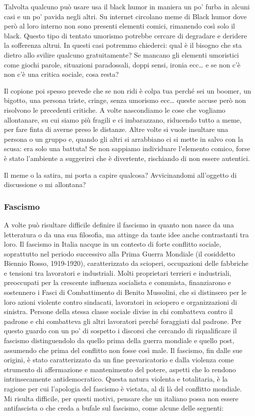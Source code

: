 \documentclass[12pt]{book} %
\begin{document}
Talvolta qualcuno può usare usa il black humor in maniera un po' furba in alcuni casi e un po' pavida negli altri. Su internet circolano meme di Black humor dove però al loro interno non sono presenti elementi comici, rimanendo così solo il black. Questo tipo di tentato umorismo potrebbe cercare di degradare e deridere la sofferenza altrui. In questi casi potremmo chiederci: qual è il bisogno che sta dietro allo svilire qualcuno gratuitamente? Se mancano gli elementi umoristici come giochi parole, situazioni paradossali, doppi sensi, ironia ecc… e se non c'è non c'è una critica sociale, cosa resta? 

Il copione poi spesso prevede che se non ridi è colpa tua perché sei un boomer, un bigotto, una persona triste, cringe, senza umorismo ecc… queste accuse però non risolvono le precedenti critiche. A volte nascondiamo le cose che vogliamo allontanare, su cui siamo più fragili e ci imbarazzano, riducendo tutto a meme, per fare finta di averne preso le distanze. Altre volte si vuole insultare una persona o un gruppo e, quando gli altri si arrabbiano ci si mette in salvo con la scusa: era solo una battuta! Se non sappiamo individuare l'elemento comico, forse è stato l'ambiente a suggerirci che è divertente, rischiando di non essere autentici.

Il meme o la satira, mi porta a capire qualcosa? Avvicinandomi all'oggetto di discussione o mi allontana?

\subsubsection{Fascismo}

A volte può risultare difficile definire il fascismo in quanto non nasce da una letteratura o da una sua filosofia, ma attinge da tante idee anche contrastanti tra loro. 
Il fascismo in Italia nacque in un contesto di forte conflitto sociale, soprattutto nel periodo successivo alla Prima Guerra Mondiale (il cosiddetto Biennio Rosso, 1919-1920), caratterizzato da scioperi, occupazioni delle fabbriche e tensioni tra lavoratori e industriali.
Molti proprietari terrieri e industriali, preoccupati per la crescente influenza socialista e comunista, finanziarono e sostennero i Fasci di Combattimento di Benito Mussolini, che si distinsero per le loro azioni violente contro sindacati, lavoratori in sciopero e organizzazioni di sinistra. Persone della stessa classe sociale divise in chi combatteva contro il padrone e chi combatteva gli altri lavoratori perché foraggiati dal padrone.
Per questo guardo con un po' di sospetto i discorsi che cercando di riqualificare il fascismo distinguendolo da quello prima della guerra mondiale e quello post, assumendo che prima del conflitto non fosse così male. Il fascismo, fin dalle sue origini, è stato caratterizzato da un fine prevaricatorio e dalla violenza come strumento di affermazione e mantenimento del potere, aspetti che lo rendono intrinsecamente antidemocratico. Questa natura violenta e totalitaria, è la ragione per cui l'apologia del fascismo è vietata, al di là del conflitto mondiale. Mi risulta difficile, per questi motivi, pensare che un italiano possa non essere antifascista o che creda a bufale sul fascismo, come alcune delle seguenti:
\end{document}
